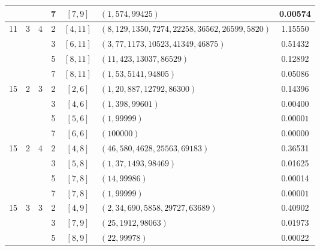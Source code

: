 \documentclass[a4paper,11pt,reqno]{article}
\theoremstyle{plain} \numberwithin{equation}{section}
\theoremstyle{definition}
\begin{document}
\begin{appendices}
\begin{table}[!ht]
\begin{tabular}{|c|c|c|c|c|l|c|}
                    &                    &                    & 7   & $[7, 9]$ & $(1, 574, 99425)$ & 0.00574 \\
\hline
\multirow{4}{*}{11} & \multirow{4}{*}{3} & \multirow{4}{*}{4} 
                    & 2   & $[4, 11]$ & $(8, 129, 1350, 7274, 22258, 36562, 26599, 5820)$ & 1.15550 \\
                    &                    &                    & 3   & $[6, 11]$ & $(3, 77, 1173, 10523, 41349, 46875)$ & 0.51432 \\
                    &                    &                    & 5   & $[8, 11]$ & $(11, 423, 13037, 86529)$ & 0.12892 \\
                    &                    &                    & 7   & $[8, 11]$ & $(1, 53, 5141, 94805)$ & 0.05086 \\
\hline
\multirow{4}{*}{15} & \multirow{4}{*}{2} & \multirow{4}{*}{3} 
                    & 2   & $[2, 6]$ & $(1, 20, 887, 12792, 86300)$ & 0.14396 \\
                    &                    &                    & 3   & $[4, 6]$ & $(1, 398, 99601)$ & 0.00400 \\
                    &                    &                    & 5   & $[5, 6]$ & $(1, 99999)$ & $0.00001$ \\
                    &                    &                    & 7   & $[6, 6]$ & $(100000)$ & 0.00000 \\
\hline
\multirow{4}{*}{15} & \multirow{4}{*}{2} & \multirow{4}{*}{4} 
                    & 2   & $[4, 8]$ & $(46, 580, 4628, 25563, 69183)$ & 0.36531 \\
                    &                    &                    & 3   & $[5, 8]$ & $(1, 37, 1493, 98469)$ & 0.01625 \\
                    &                    &                    & 5   & $[7, 8]$ & $(14, 99986)$ & 0.00014 \\
                    &                    &                    & 7   & $[7, 8]$ & $(1, 99999)$ & $0.00001$ \\
\hline
\multirow{4}{*}{15} & \multirow{4}{*}{3} & \multirow{4}{*}{3} 
                    & 2   & $[4, 9]$ & $(2, 34, 690, 5858, 29727, 63689)$ & 0.40902 \\
                    &                    &                    & 3   & $[7, 9]$ & $(25, 1912, 98063)$ & 0.01973 \\
                    &                    &                    & 5   & $[8, 9]$ & $(22, 99978)$ & 0.00022 \\

\end{tabular}
\end{table}
\end{appendices}
\end{document}
